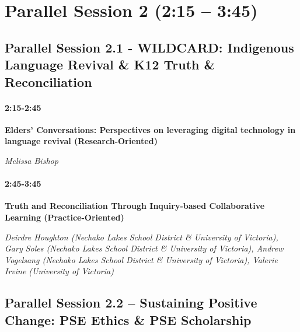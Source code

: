 \documentclass[
]{book}
\begin{document}
\hypertarget{parallel-session-2-215-345}{%
\section*{Parallel Session 2 (2:15 -- 3:45)}\label{parallel-session-2-215-345}}

\hypertarget{parallel-session-2.1---wildcard-indigenous-language-revival-k12-truth-reconciliation}{%
\subsection*{Parallel Session 2.1 - WILDCARD: Indigenous Language Revival \& K12 Truth \& Reconciliation}\label{parallel-session-2.1---wildcard-indigenous-language-revival-k12-truth-reconciliation}}

\begin{secondary}
\hypertarget{section}{%
\paragraph{2:15-2:45}\label{section}}

\textbf{Elders' Conversations: Perspectives on leveraging digital
technology in language revival (Research-Oriented)}

\emph{Melissa Bishop}
\end{secondary}

\begin{secondary}
\hypertarget{section}{%
\paragraph*{2:45-3:45}\label{section}}

\textbf{Truth and Reconciliation Through Inquiry-based Collaborative
Learning (Practice-Oriented)}

\emph{Deirdre Houghton (Nechako Lakes School District \& University of
Victoria), Gary Soles (Nechako Lakes School District \& University of
Victoria), Andrew Vogelsang (Nechako Lakes School District \& University
of Victoria), Valerie Irvine (University of Victoria)}
\end{secondary}

\hypertarget{parallel-session-2.2-sustaining-positive-change-pse-ethics-pse-scholarship}{%
\subsection*{Parallel Session 2.2 -- Sustaining Positive Change: PSE Ethics \& PSE Scholarship}\label{parallel-session-2.2-sustaining-positive-change-pse-ethics-pse-scholarship}}
\end{document}
